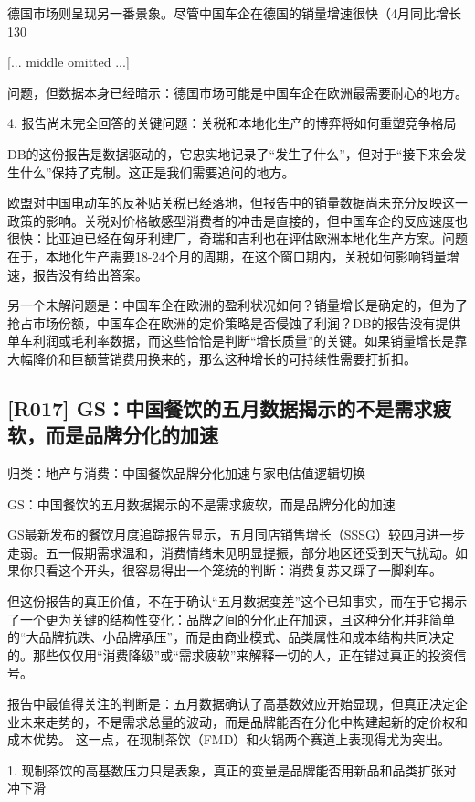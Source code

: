 \documentclass[11pt]{ctexart}
\begin{document}
德国市场则呈现另一番景象。尽管中国车企在德国的销量增速很快（4月同比增长130

[... middle omitted ...]

问题，但数据本身已经暗示：德国市场可能是中国车企在欧洲最需要耐心的地方。

4. 报告尚未完全回答的关键问题：关税和本地化生产的博弈将如何重塑竞争格局

DB的这份报告是数据驱动的，它忠实地记录了“发生了什么”，但对于“接下来会发生什么”保持了克制。这正是我们需要追问的地方。

欧盟对中国电动车的反补贴关税已经落地，但报告中的销量数据尚未充分反映这一政策的影响。关税对价格敏感型消费者的冲击是直接的，但中国车企的反应速度也很快：比亚迪已经在匈牙利建厂，奇瑞和吉利也在评估欧洲本地化生产方案。问题在于，本地化生产需要18-24个月的周期，在这个窗口期内，关税如何影响销量增速，报告没有给出答案。

另一个未解问题是：中国车企在欧洲的盈利状况如何？销量增长是确定的，但为了抢占市场份额，中国车企在欧洲的定价策略是否侵蚀了利润？DB的报告没有提供单车利润或毛利率数据，而这些恰恰是判断“增长质量”的关键。如果销量增长是靠大幅降价和巨额营销费用换来的，那么这种增长的可持续性需要打折扣。

\subsection{[R017] GS：中国餐饮的五月数据揭示的不是需求疲软，而是品牌分化的加速}
{\small\color{refgray}归类：地产与消费：中国餐饮品牌分化加速与家电估值逻辑切换}

GS：中国餐饮的五月数据揭示的不是需求疲软，而是品牌分化的加速

GS最新发布的餐饮月度追踪报告显示，五月同店销售增长（SSSG）较四月进一步走弱。五一假期需求温和，消费情绪未见明显提振，部分地区还受到天气扰动。如果你只看这个开头，很容易得出一个笼统的判断：消费复苏又踩了一脚刹车。

但这份报告的真正价值，不在于确认“五月数据变差”这个已知事实，而在于它揭示了一个更为关键的结构性变化：品牌之间的分化正在加速，且这种分化并非简单的“大品牌抗跌、小品牌承压”，而是由商业模式、品类属性和成本结构共同决定的。那些仅仅用“消费降级”或“需求疲软”来解释一切的人，正在错过真正的投资信号。

报告中最值得关注的判断是：五月数据确认了高基数效应开始显现，但真正决定企业未来走势的，不是需求总量的波动，而是品牌能否在分化中构建起新的定价权和成本优势。 这一点，在现制茶饮（FMD）和火锅两个赛道上表现得尤为突出。

1. 现制茶饮的高基数压力只是表象，真正的变量是品牌能否用新品和品类扩张对冲下滑
\end{document}
